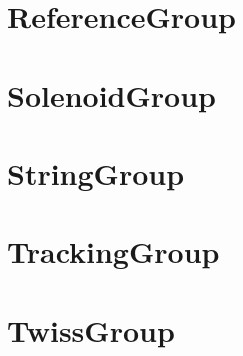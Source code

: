 \section{ReferenceGroup}
\label{s:reference.g}

\section{SolenoidGroup}
\label{s:solenoid.g}

\section{StringGroup}
\label{s:string.g}

\section{TrackingGroup}
\label{s:tracking.g}

\section{TwissGroup}
\label{s:twiss.g}

